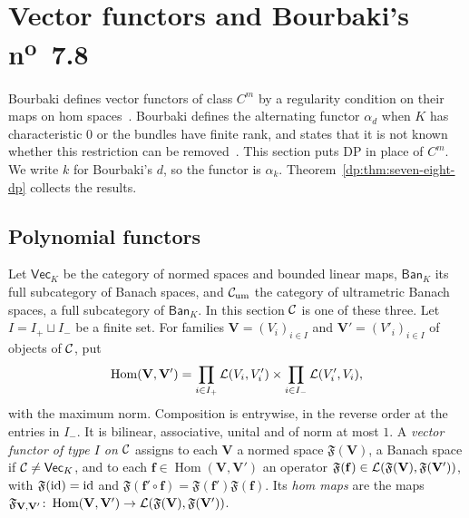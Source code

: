 \section{Vector functors and Bourbaki's \texorpdfstring{n\textsuperscript{o}~7.8}{no. 7.8}}\label{dp:sec:functors}

Bourbaki defines vector functors of class $C^m$ by a regularity condition on their maps on hom spaces~\cite[n\textsuperscript{o}~7.6.1]{Bou}. Bourbaki defines the alternating functor $\alpha_d$ when $K$ has characteristic $0$ or the bundles have finite rank, and states that it is not known whether this restriction can be removed~\cite[n\textsuperscript{o}~7.8]{Bou}. This section puts DP in place of $C^m$. We write $k$ for Bourbaki's $d$, so the functor is $\alpha_k$. Theorem~\ref{dp:thm:seven-eight-dp} collects the results.

\subsection{Polynomial functors}

Let $\mathsf{Vec}_K$ be the category of normed spaces and bounded linear maps, $\mathsf{Ban}_K$ its full subcategory of Banach spaces, and $\mathcal{C}_{\rm um}$ the category of ultrametric Banach spaces, a full subcategory of $\mathsf{Ban}_K$. In this section $\mathcal{C}$ is one of these three. Let $I=I_+\sqcup I_-$ be a finite set. For families $\mathbf V=(V_i)_{i\in I}$ and $\mathbf V'=(V'_i)_{i\in I}$ of objects of $\mathcal{C}$, put
\[
 \operatorname{Hom}(\mathbf V,\mathbf V')=\prod_{i\in I_+}\mathcal L(V_i,V_i')\times\prod_{i\in I_-}\mathcal L(V_i',V_i),
\]
with the maximum norm. Composition is entrywise, in the reverse order at the entries in $I_-$. It is bilinear, associative, unital and of norm at most $1$. A \emph{vector functor of type $I$ on $\mathcal{C}$} assigns to each $\mathbf V$ a normed space $\mathfrak F(\mathbf V)$, a Banach space if $\mathcal{C}\ne\mathsf{Vec}_K$, and to each $\mathbf f\in\operatorname{Hom}(\mathbf V,\mathbf V')$ an operator $\mathfrak F(\mathbf f)\in\mathcal L(\mathfrak F(\mathbf V),\mathfrak F(\mathbf V'))$, with $\mathfrak F(\mathrm{id})=\mathrm{id}$ and $\mathfrak F(\mathbf f'\circ\mathbf f)=\mathfrak F(\mathbf f')\mathfrak F(\mathbf f)$. Its \emph{hom maps} are the maps $\mathfrak F_{\mathbf V,\mathbf V'}\colon\operatorname{Hom}(\mathbf V,\mathbf V')\to\mathcal L(\mathfrak F(\mathbf V),\mathfrak F(\mathbf V'))$.

